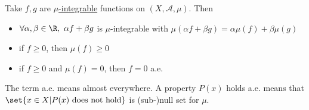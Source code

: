 \documentclass{article}
\newcommand{\1}[1]{\mathbbm{1}_{#1}}
\begin{document}

\begin{cor}
    Take $f, g$ are \hyperlink{def:integral}{$\mu$-integrable} functions on $(X, \mathcal{A}, \mu)$. Then
    \begin{itemize}
        \item $\forall \alpha, \beta \in \R, \ \alpha f + \beta g$ is $\mu$-integrable with
            $\mu(\alpha f + \beta g) = \alpha \mu(f) + \beta \mu(g)$
        \item if $f \geq 0$, then $\mu(f) \geq 0$
        \item if $f \geq 0$ and $\mu(f) = 0$, then $f=0$ a.e.
    \end{itemize}
\end{cor}

\begin{remark}
    The term a.e. means almost everywhere.  A property $P(x)$ holds a.e. means that $\set{x \in X | P(x) \ \text{does not hold}}$ is (sub-)null set for $\mu$.
\end{remark}
\end{document}
